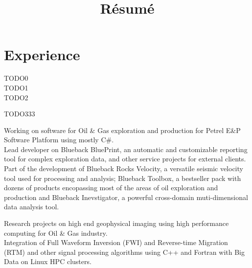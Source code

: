 \documentclass[11pt, a4paper, sans]{moderncv} %
\title{R\'esum\'e}
\begin{document}
\makecvtitle %




\section{Experience}

{
TODO0 \\
TODO1 \\
TODO2 \\
}

{
TODO333
}

{
Working on software for Oil \& Gas exploration and production for Petrel E\&P Software Platform using mostly C\#.\\ 
Lead developer on  Blueback BluePrint, an automatic and customizable reporting tool for complex exploration data, and other service projects for external clients.\\
Part of the development of Blueback Rocks Velocity, a versatile seismic velocity tool used for processing and analysis;  Blueback Toolbox, a bestseller pack with dozens of products encopassing most of the areas of oil exploration and production and Blueback Inevstigator, a powerful cross-domain muti-dimensional data analysis tool.
}


{
Research projects on high end geophysical imaging using high performance computing for Oil \& Gas industry.\\
Integration of Full Waveform Inversion (FWI) and Reverse-time Migration (RTM) and other signal processing algorithms using C++ and Fortran with Big Data on Linux HPC clusters.
}
\end{document}
